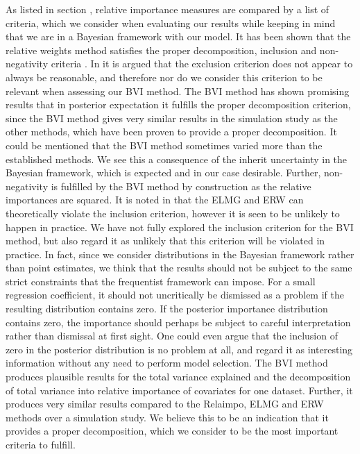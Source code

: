 \newline
\newline
As listed in section , relative importance measures are compared by a list of criteria, which we consider when evaluating our results while keeping in mind that we are in a Bayesian framework with our model.
It has been shown that the relative weights method satisfies the proper decomposition, inclusion and non-negativity criteria \citep{matre}.
In \citet{gromping_relaimpo} it is argued that the exclusion criterion does not appear to always be reasonable, and therefore nor do we consider this criterion to be relevant when assessing our BVI method. 
The BVI method has shown promising results that in posterior expectation it fulfills the proper decomposition criterion, since the BVI method gives very similar results in the simulation study as the other methods, which have been proven to provide a proper decomposition.
It could be mentioned that the BVI method sometimes varied more than the established methods.
We see this a consequence of the inherit uncertainty in the Bayesian framework, which is expected and in our case desirable.
Further, non-negativity is fulfilled by the BVI method by construction as the relative importances are squared.
It is noted in \citet{matre} that the ELMG and ERW can theoretically violate the inclusion criterion, however it is seen to be unlikely to happen in practice.
We have not fully explored the inclusion criterion for the BVI method, but also regard it as unlikely that this criterion will be violated in practice.
In fact, since we consider distributions in the Bayesian framework rather than point estimates, we think that the results should not be subject to the same strict constraints that the frequentist framework can impose.
For a small regression coefficient, it should not uncritically be dismissed as a problem if the resulting distribution contains zero. 
If the posterior importance distribution contains zero, the importance should perhaps be subject to careful interpretation rather than dismissal at first sight.
One could even argue that the inclusion of zero in the posterior distribution is no problem at all, and regard it as interesting information without any need to perform model selection. 
The BVI method produces plausible results for the total variance explained and the decomposition of total variance into relative importance of covariates for one dataset.
Further, it produces very similar results compared to the Relaimpo, ELMG and ERW methods over a simulation study.
We believe this to be an indication that it provides a proper decomposition, which we consider to be the most important criteria to fulfill.
